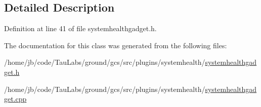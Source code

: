 \subsection{\-Detailed \-Description}


\-Definition at line 41 of file systemhealthgadget.\-h.



\-The documentation for this class was generated from the following files\-:\begin{DoxyCompactItemize}
\item 
/home/jb/code/\-Tau\-Labs/ground/gcs/src/plugins/systemhealth/\hyperlink{systemhealthgadget_8h}{systemhealthgadget.\-h}\item 
/home/jb/code/\-Tau\-Labs/ground/gcs/src/plugins/systemhealth/\hyperlink{systemhealthgadget_8cpp}{systemhealthgadget.\-cpp}\end{DoxyCompactItemize}
